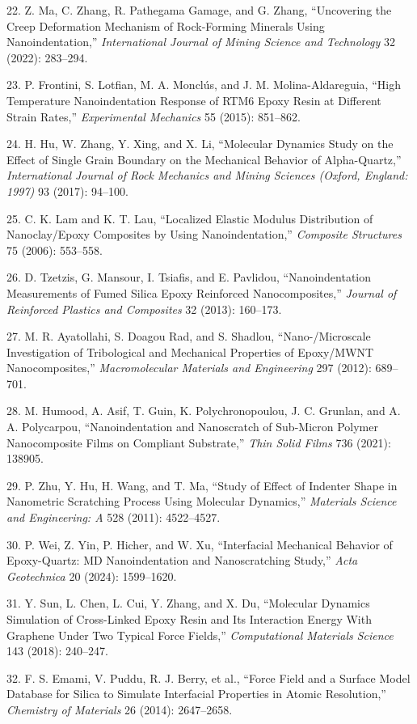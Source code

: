 \documentclass{article}
\begin{document}
\begin{hangpars}
22. Z. Ma, C. Zhang, R. Pathegama Gamage, and G. Zhang, “Uncovering the Creep Deformation Mechanism of Rock-Forming Minerals Using Nanoindentation,” \emph{International Journal of Mining Science and Technology} 32 (2022): 283–294.

23. P. Frontini, S. Lotfian, M. A. Monclús, and J. M. Molina-Aldareguia, “High Temperature Nanoindentation Response of RTM6 Epoxy Resin at Different Strain Rates,” \emph{Experimental Mechanics} 55 (2015): 851–862.

24. H. Hu, W. Zhang, Y. Xing, and X. Li, “Molecular Dynamics Study on the Effect of Single Grain Boundary on the Mechanical Behavior of Alpha-Quartz,” \emph{International Journal of Rock Mechanics and Mining Sciences (Oxford, England: 1997)} 93 (2017): 94–100.

25. C. K. Lam and K. T. Lau, “Localized Elastic Modulus Distribution of Nanoclay/Epoxy Composites by Using Nanoindentation,” \emph{Composite Structures} 75 (2006): 553–558.

26. D. Tzetzis, G. Mansour, I. Tsiafis, and E. Pavlidou, “Nanoindentation Measurements of Fumed Silica Epoxy Reinforced Nanocomposites,” \emph{Journal of Reinforced Plastics and Composites} 32 (2013): 160–173.

27. M. R. Ayatollahi, S. Doagou Rad, and S. Shadlou, “Nano-/Microscale Investigation of Tribological and Mechanical Properties of Epoxy/MWNT Nanocomposites,” \emph{Macromolecular Materials and Engineering} 297 (2012): 689–701.

28. M. Humood, A. Asif, T. Guin, K. Polychronopoulou, J. C. Grunlan, and A. A. Polycarpou, “Nanoindentation and Nanoscratch of Sub-Micron Polymer Nanocomposite Films on Compliant Substrate,” \emph{Thin Solid Films} 736 (2021): 138905.

29. P. Zhu, Y. Hu, H. Wang, and T. Ma, “Study of Effect of Indenter Shape in Nanometric Scratching Process Using Molecular Dynamics,” \emph{Materials Science and Engineering: A} 528 (2011): 4522–4527.

30. P. Wei, Z. Yin, P. Hicher, and W. Xu, “Interfacial Mechanical Behavior of Epoxy-Quartz: MD Nanoindentation and Nanoscratching Study,” \emph{Acta Geotechnica} 20 (2024): 1599–1620.

31. Y. Sun, L. Chen, L. Cui, Y. Zhang, and X. Du, “Molecular Dynamics Simulation of Cross-Linked Epoxy Resin and Its Interaction Energy With Graphene Under Two Typical Force Fields,” \emph{Computational Materials Science} 143 (2018): 240–247.

32. F. S. Emami, V. Puddu, R. J. Berry, et al., “Force Field and a Surface Model Database for Silica to Simulate Interfacial Properties in Atomic Resolution,” \emph{Chemistry of Materials} 26 (2014): 2647–2658.


\end{hangpars}
\end{document}
